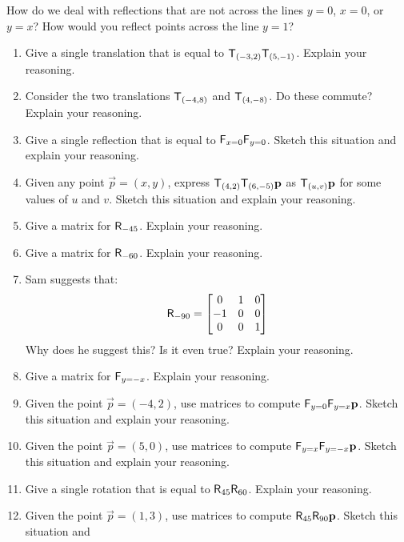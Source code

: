 \begin{ques} 
How do we deal with reflections that are not across the lines $y=0$,
$x=0$, or $y=x$? How would you reflect points across the line $y = 1$?
\end{ques}
\QM





\newpage

\problems

\begin{enumerate}
\item Give a single translation that is equal to
  $\mathsf{T}_{(-3,2)}\mathsf{T}_{(5,-1)}$. Explain your reasoning.
\item Consider the two translations $\mathsf{T}_{(-4,8)}$ and
  $\mathsf{T}_{(4,-8)}$.  Do these commute?  Explain your reasoning.
\item Give a single reflection that is equal to
  $\mathsf{F}_{x=0}\mathsf{F}_{y=0}$. Sketch this situation and
  explain your reasoning.
\item Given any point $\vec{p} = (x,y)$, express
  $\mathsf{T}_{(4,2)}\mathsf{T}_{(6,-5)}\mathbf{p}$ as $\mathsf{T}_{(u,v)}\mathbf{p}$
  for some values of $u$ and $v$. Sketch this situation and explain
  your reasoning.
\item Give a matrix for $\mathsf{R}_{-45}$. Explain your reasoning.
\item Give a matrix for $\mathsf{R}_{-60}$. Explain your reasoning.
\item Sam suggests that:
\[
\mathsf{R}_{-90} = 
\begin{bmatrix}
0 & 1 & 0 \\
-1 & 0 & 0 \\ 
0 & 0 & 1
\end{bmatrix}
\]
Why does he suggest this? Is it even true? Explain your reasoning.
\item Give a matrix for $\mathsf{F}_{y=-x}$. Explain your reasoning.
\item Given the point $\vec{p}=(-4,2)$, use matrices to compute
  $\mathsf{F}_{y=0}\mathsf{F}_{y=x}\mathbf{p}$. Sketch this situation and
  explain your reasoning.
\item Given the point $\vec{p}=(5,0)$, use matrices to compute
  $\mathsf{F}_{y=x}\mathsf{F}_{y=-x}\mathbf{p}$. Sketch this situation and
  explain your reasoning.
\item Give a single rotation that is equal to
  $\mathsf{R}_{45}\mathsf{R}_{60}$. Explain your reasoning.
\item Given the point $\vec{p}=(1,3)$, use matrices to compute
  $\mathsf{R}_{45}\mathsf{R}_{90}\mathbf{p}$.  Sketch this situation and

\end{enumerate}

